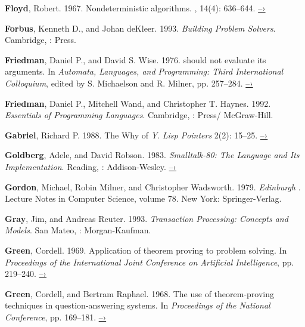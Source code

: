  \label{Floyd (1967)}
\textbf{Floyd}, Robert. 1967. Nondeterministic algorithms. \textit{},
14(4): 636--644.
\href{http://citeseerx.ist.psu.edu/viewdoc/summary?doi=10.1.1.332.36}{–›}

 \label{Forbus and deKleer 1993}
\textbf{Forbus}, Kenneth D., and Johan deKleer.  1993. \textit{Building Problem
Solvers}. Cambridge, :  Press.

 \label{Friedman and Wise (1976)}
\textbf{Friedman}, Daniel P., and David S. Wise.  1976.   should not
evaluate its arguments. In \textit{Automata, Languages, and Programming: Third
International Colloquium}, edited by S. Michaelson and R.  Milner, pp. 257--284.
\href{https://www.cs.indiana.edu/cgi-bin/techreports/TRNNN.cgi?trnum=TR44}{–›}

 \label{Friedman et al. 1992}
\textbf{Friedman}, Daniel P., Mitchell Wand, and Christopher T. Haynes. 1992.
\textit{Essentials of Programming Languages}.  Cambridge, : 
Press/ McGraw-Hill.

 \label{Gabriel 1988}
\textbf{Gabriel}, Richard P. 1988.  The Why of \emph{Y}.  \textit{Lisp Pointers}
2(2): 15--25.
\href{http://www.dreamsongs.com/Files/WhyOfY.pdf}{–›}

\textbf{Goldberg}, Adele, and David Robson.  1983.  \textit{Smalltalk-80: The Language and
Its Implementation}. Reading, : Addison-Wesley.
\href{http://stephane.ducasse.free.fr/FreeBooks/BlueBook/Bluebook.pdf}{–›}

 \label{Gordon et al. 1979}
\textbf{Gordon}, Michael, Robin Milner, and Christopher Wadsworth.  1979.
\textit{Edinburgh }. Lecture Notes in Computer Science, volume 78. New York:
Springer-Verlag.

 \label{Gray and Reuter 1993}
\textbf{Gray}, Jim, and Andreas Reuter. 1993. \textit{Transaction Processing: Concepts and
Models}. San Mateo, : Morgan-Kaufman.

 \label{Green 1969}
\textbf{Green}, Cordell.  1969.  Application of theorem proving to problem solving.  In
\textit{Proceedings of the International Joint Conference on Artificial
Intelligence}, pp. 219--240.
\href{http://citeseer.ist.psu.edu/viewdoc/summary?doi=10.1.1.81.9820}{–›}

 \label{Green and Raphael (1968)}
\textbf{Green}, Cordell, and Bertram Raphael.  1968.  The use of theorem-proving
techniques in question-answering systems.  In \textit{Proceedings of the
 National Conference}, pp. 169--181.
\href{http://www.kestrel.edu/home/people/green/publications/green-raphael.pdf}{–›}

